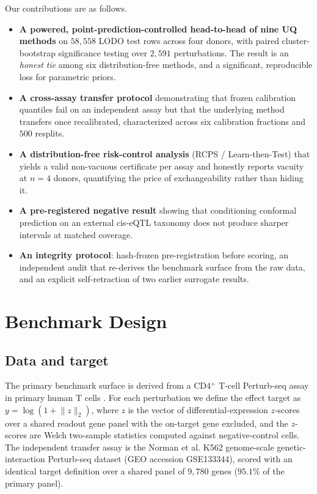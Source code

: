 \documentclass{article}
\begin{document}
Our contributions are as follows.
\begin{itemize}
\item \textbf{A powered, point-prediction-controlled head-to-head of nine
UQ methods} on $58{,}558$ LODO test rows across four donors, with paired
cluster-bootstrap significance testing over $2{,}591$ perturbations.
The result is an \emph{honest tie} among six distribution-free methods,
and a significant, reproducible loss for parametric priors.
\item \textbf{A cross-assay transfer protocol} demonstrating that frozen
calibration quantiles fail on an independent assay but that the
underlying method transfers once recalibrated, characterized across six
calibration fractions and $500$ resplits.
\item \textbf{A distribution-free risk-control analysis} (RCPS /
Learn-then-Test) that yields a valid non-vacuous certificate per assay
and honestly reports vacuity at $n{=}4$ donors, quantifying the price of
exchangeability rather than hiding it.
\item \textbf{A pre-registered negative result} showing that conditioning
conformal prediction on an external cis-eQTL taxonomy does not produce
sharper intervals at matched coverage.
\item \textbf{An integrity protocol}: hash-frozen pre-registration before
scoring, an independent audit that re-derives the benchmark surface from
the raw data, and an explicit self-retraction of two earlier surrogate
results.
\end{itemize}

\section{Benchmark Design}

\subsection{Data and target}

The primary benchmark surface is derived from a CD4$^{+}$ T-cell
Perturb-seq assay in primary human T cells
\citep{schmidt2022crispr}. For each perturbation we define the effect
target as $y = \log(1 + \lVert z \rVert_2)$, where $z$ is the vector of
differential-expression $z$-scores over a shared readout gene panel with
the on-target gene excluded, and the $z$-scores are Welch two-sample
statistics computed against negative-control cells. The independent
transfer assay is the Norman et al. K562 genome-scale genetic-interaction
Perturb-seq dataset \citep{norman2019exploring} (GEO accession
GSE133344), scored with an identical target definition over a shared
panel of $9{,}780$ genes ($95.1\%$ of the primary panel).
\end{document}
